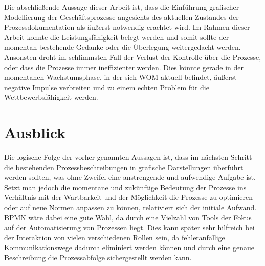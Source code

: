 \documentclass[a4paper,12pt]{report}
\begin{document}
Die abschließende Aussage dieser Arbeit ist, dass die Einführung grafischer Modellierung der Geschäftsprozesse angesichts des aktuellen Zustandes der Prozessdokumentation als äußerst notwendig erachtet wird. Im Rahmen dieser Arbeit konnte die Leistungsfähigkeit belegt werden und somit sollte der momentan bestehende Gedanke oder die Überlegung weitergedacht werden. Ansonsten droht im schlimmsten Fall der Verlust der Kontrolle über die Prozesse, oder dass die Prozesse immer ineffizienter werden. Dies könnte gerade in der momentanen Wachstumsphase, in der sich WOM aktuell befindet, äußerst negative Impulse verbreiten und zu einem echten Problem für die Wettbewerbsfähigkeit werden.

\section{Ausblick}\label{sec:Ausblick}
Die logische Folge der vorher genannten Aussagen ist, dass im nächsten Schritt die bestehenden Prozessbeschreibungen in grafische Darstellungen überführt werden sollten, was ohne Zweifel eine anstrengende und aufwendige Aufgabe ist. Setzt man jedoch die momentane und zukünftige Bedeutung der Prozesse ins Verhältnis mit der Wartbarkeit und der Möglichkeit die Prozesse zu optimieren oder auf neue Normen anpassen zu können, relativiert sich der initiale Aufwand. BPMN wäre dabei eine gute Wahl, da durch eine Vielzahl von Tools der Fokus auf der Automatisierung von Prozessen liegt. Dies kann später sehr hilfreich bei der Interaktion von vielen verschiedenen Rollen sein, da fehleranfällige Kommunikationswege dadurch eliminiert werden können und durch eine genaue Beschreibung die Prozessabfolge sichergestellt werden kann.
\end{document}
